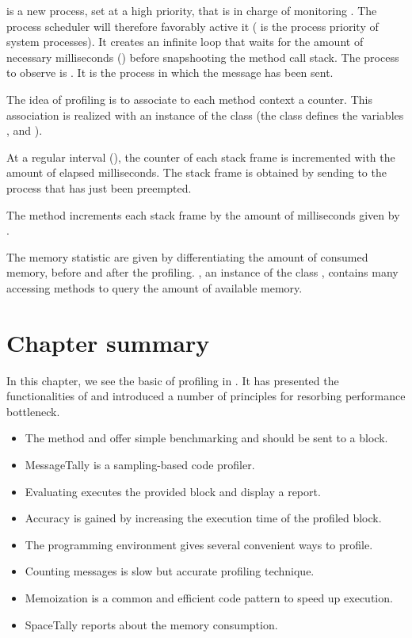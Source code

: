 \documentclass[a4paper,10pt,twoside]{book}
\begin{document}
 is a new process, set at a high priority, that is in charge of monitoring . The process scheduler will therefore favorably active it ( is the process priority of system processes). It creates an infinite loop that waits for the amount of necessary milliseconds () before snapshooting the method call stack. The process to observe is . It is the process in which the message  has been sent. 

The idea of profiling is to associate to each method context a counter. This association is realized with an instance of the class  (the class defines the variables ,  and ).

At a regular interval (), the counter of each stack frame is incremented with the amount of elapsed milliseconds. The stack frame is obtained by sending  to the process that has just been preempted.

The method  increments each stack frame by the amount of milliseconds given by .

The memory statistic are given by differentiating the amount of consumed memory, before and after the profiling. , an instance of the class , contains many accessing methods to query the amount of available memory.

\section{Chapter summary}

In this chapter, we see the basic of profiling in \pharo. It has presented the functionalities of  and introduced a number of principles for resorbing performance bottleneck. 
\begin{itemize}
\item The method  and  offer simple benchmarking and should be sent to a block.

\item MessageTally is a sampling-based code profiler.
\item Evaluating  executes the provided block and display a report.
\item Accuracy is gained by increasing the execution time of the profiled block.
\item The \pharo programming environment gives several convenient ways to profile.
\item Counting messages is slow but accurate profiling technique.
\item Memoization is a common and efficient code pattern to speed up execution.
\item SpaceTally reports about the memory consumption.
\end{itemize}





\ifx\wholebook\relax\else
\end{document}

